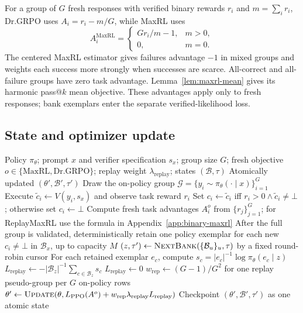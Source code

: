 For a group of $G$ fresh responses with verified binary rewards $r_i$ and
$m=\sum_i r_i$, Dr.GRPO uses $A_i=r_i-m/G$, while MaxRL uses
\[
 A_i^{\mathrm{MaxRL}}=
 \begin{cases}
 G r_i/m-1, & m>0,\\
 0, & m=0.
 \end{cases}
\]
The centered MaxRL estimator \citep{tajwar2026maxrl} gives failures advantage
$-1$ in mixed groups and weights each success more strongly when successes
are scarce. All-correct and all-failure groups have zero task advantage.
Lemma~\ref{lem:maxrl-mean} gives its harmonic pass@\(k\) mean objective.
These advantages apply only to fresh responses; bank exemplars enter the
separate verified-likelihood loss.

\subsection{State and optimizer update}
\label{app:algorithm-update}

\begin{algorithm}[H]
  \caption{One ReplayMaxRL optimizer update}
  \label{alg:verified-replay-update}
  \small
  \begin{algorithmic}[1]
    \REQUIRE Policy $\pi_\theta$; prompt $x$ and verifier specification
      $s_x$; group size $G$; fresh objective $o\in\{\mathrm{MaxRL},\mathrm{Dr.GRPO}\}$; replay weight $\lambda_{\mathrm{replay}}$;
      states $(\mathcal B,\tau)$
    \ENSURE Atomically updated $(\theta',\mathcal B',\tau')$
    \STATE Draw the on-policy group
      $\mathcal G=\{y_i\sim\pi_\theta(\cdot\mid x)\}_{i=1}^G$
      \STATE Execute $\widetilde c_i\gets V(y_i,s_x)$ and observe task
        reward $r_i$
      \STATE Set $c_i\gets\widetilde c_i$ iff
        $r_i>0\wedge\widetilde c_i\ne\bot$; otherwise set $c_i\gets\bot$
    \ENDFOR
    \STATE Compute fresh task advantages $A_i^{o}$ from $\{r_j\}_{j=1}^G$; for ReplayMaxRL use the formula in Appendix~\ref{app:binary-maxrl}
    \STATE After the full group is validated, deterministically retain one
      policy exemplar for each new $c_i\ne\bot$ in $\mathcal B_x$, up to
      capacity $M$
    \STATE $(z,\tau')\gets\textsc{NextBank}
      (\{\mathcal B_u\}_u,\tau)$ by a fixed round-robin cursor
      \STATE For each retained exemplar $e_c$, compute
        $s_c=|e_c|^{-1}\log\pi_\theta(e_c\mid z)$
      \STATE $L_{\mathrm{replay}}\gets-|\mathcal B_z|^{-1}
        \sum_{c\in\mathcal B_z}s_c$
    \ELSE
      \STATE $L_{\mathrm{replay}}\gets0$
    \ENDIF
    \STATE $w_{\mathrm{rep}}\gets(G-1)/G^2$ for one replay
      pseudo-group per $G$ on-policy rows
    \STATE $\theta'\gets\textsc{Update}
      (\theta,L_{\mathrm{PPO}}(A^{o})
      +w_{\mathrm{rep}}\lambda_{\mathrm{replay}}L_{\mathrm{replay}})$
    \STATE Checkpoint $(\theta',\mathcal B',\tau')$ as one atomic state
\end{algorithmic}
\end{algorithm}

